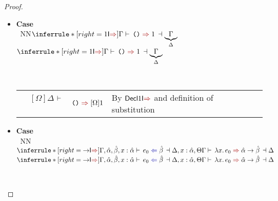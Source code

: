 \documentclass[a4paper]{article}
\makeatletter
\newcommand{\mathcolor}[2]{\text{\textcolor{#1}{\ensuremath{#2}}}}
\newcommand{\arr}{\rightarrow}
\def\CompactJudgments{0}
\newcommand{\entails}{\mathrel{\ifnum\CompactJudgments=1\vdash \else \vdash\,\fi}}
\newcommand{\ctxoutsym}{\ifnum\CompactJudgments=1\dashv \else \,\dashv \fi}
\newcommand{\ctxout}[1]{\mathrel{\ctxoutsym}{#1}}
\newcommand{\tyname}[1]{\textsf{\normalfont #1}}
\newcommand{\unitexp}{\text{\normalfont \tt()}}
\newcommand{\unitty}{\tyname{1}}
\newcommand{\Lemmaref}[1]{Lemma \ref{#1} (\nameref{#1})}   \newcommand{\Lemref}[1]{\Lemma \ref{#1}}   \newcommand{\Conjectureref}[1]{Conjecture \ref{#1}}
\gdef\xxDerivationProofCaseColor{N}
\newcommand{\DerivationProofCase}[3]{\smallskip
     \item \parbox[t]{100ex}{\textbf{Case } \\[-0.5em]
       $~$\hspace{5ex}
       \if\xxDerivationProofCaseColor N\ensuremath{\Infer{#1}{#2}{#3}}
       \else \colorbox{\xxDerivationProofCaseColor}{\ensuremath{\Infer{#1}{#2}{#3}}}\fi }\nopagebreak \\[-0.8ex]
  }
\newcommand{\BeginProof}{\renewcommand{\arraystretch}{1.1} \begin{tabular}[b]{r@{}r @{} l  l}}
\newcommand{\EndProof}{\end{tabular} \renewcommand{\arraystretch}{\mydefaultarraystretch}}
\newcommand{\Hand}{\text{\Pointinghand~~~~}}
\newcommand{\Pf}[4] {&$#1$ $#2$\, & $#3$ & #4 \\}
\newcommand{\Pfmrg}[3] {&$#1$\, & $#2$ & #3 \\}
\newcommand{\mkpf}[4] {\Pf{#2}{#1\,}{#3}{#4}}
\newcommand{\eqPf}[3] {\mkpf{=}{#1}{#2}{#3}}
\newcommand{\proofsep}{\,\\[-0.5em]}
\newenvironment{llproof}{\BeginProof}{\EndProof}
\newcommand{\decolumnizePf}{\end{llproof} ~\\ \begin{llproof}}
\newcommand{\Infer}[3]{\inferrule*[right={\text{\strut#1}}]{{}#2\mathstrut}{{}#3\mathstrut}}
\newcommand{\lam}[1]{\lambda #1.\,}
\newcommand{\substextendPf}[3] {\Pfmrg{{#1} \extendssym\,}{#2}{#3}}
\newcommand{\chkcolor}{dBlue}
\newcommand{\syncolor}{dRed}
\newcommand{\appcolor}{dDkGreen}
\newcommand{\chk}{\mathrel{\mathcolor{\chkcolor}{\Leftarrow}}}
\newcommand{\uncoloredsyn}{{\Rightarrow}}
\newcommand{\syn}{\mathrel{\mathcolor{\syncolor}{\uncoloredsyn}}}
\newcommand{\appsep}{\;{\mathcolor{\appcolor}{\bullet}}\;}
\newcommand{\app}{\mathrel{\mathcolor{\appcolor}{{\uncoloredsyn}\hspace{-1.2ex}{\uncoloredsyn}}}}
\newcommand{\chkjudg}[4]{\ensuremath{{#1} \entails {#2} \chk {#3} \ctxout{#4}}}
\newcommand{\synjudg}[4]{\ensuremath{{#1} \entails {#2} \syn {#3} \ctxout{#4}}}
\newcommand{\chkjudgPf}[5]{\Pf{#1}{\entails}{{#2} \chk {#3} \ctxout{#4}}{#5}}
\newcommand{\declchkjudgPf}[4]{\Pf{#1}{\entails}{{#2} \chk {#3}}{#4}}
\newcommand{\declappjudgPf}[5]{\Pf{#1}{\entails}{{#3} \appsep {#2} \app {#4}}{#5}}
\newcommand{\declsynjudgPf}[4]{\Pf{#1}{\entails}{{#2} \syn {#3}}{#4}}
\newcommand{\hypeq}[2]{{#1} = {#2}}
\newcommand{\extendssym}{\longrightarrow}
\newcommand{\ahat}{\hat{\alpha}}
\newcommand{\bhat}{\hat{\beta}}
\newcommand{\rulename}[1]{\text{\normalfont\textsf{#1}}}
\newcommand{\Decltyrulename}[1]{\ensuremath{\rulename{Decl#1}}\xspace}
\newcommand{\DeclIntroSynrulename}[1]{\Decltyrulename{\ensuremath{#1}I$\syn$}}
\newcommand{\DeclApprulename}[1]{\Decltyrulename{\ensuremath{#1}App}}
\newcommand{\DeclUnitIntroSyn}{\DeclIntroSynrulename{\unitty}}
\newcommand{\DeclArrApp}{\DeclApprulename{\arr}}
\newcommand{\Tyrulename}[1]{\ensuremath{\rulename{#1}}\xspace}
\newcommand{\IntroSynrulename}[1]{\Tyrulename{\ensuremath{#1}I$\syn$}}
\newcommand{\UnitIntroSyn}{\IntroSynrulename{\unitty}}
\newcommand{\ArrIntroSyn}{\IntroSynrulename{\arr}}
\makeatother
\begin{document}
\begin{proof}
\begin{itemize}
            \begin{llproof}
                \chkjudgPf{\overbrace{\Gamma_0[\ahat_2, \ahat_1, \hypeq{\ahat}{\ahat_1 \arr \ahat_2}]}^{\Gamma'}}{e}{\ahat_1}{\Delta}   {Subderivation}
                \substextendPf{\Delta}{\Omega}   {Given}
                \declchkjudgPf{[\Omega]\Delta}{e}{[\Omega]\ahat_1}   {By i.h.}
                \declappjudgPf{[\Omega]\Delta}{e}{([\Omega]\ahat_1) \arr ([\Omega]\ahat_2)}{[\Omega]\ahat_2}    {By \DeclArrApp}
                \decolumnizePf
                \substextendPf{\Gamma'}{\Delta}   {By \Lemmaref{lem:typing-extension}}
                \substextendPf{\Delta}{\Omega}   {Given}
                \substextendPf{\Gamma'}{\Omega}   {By \Lemmaref{lem:substextend-transitivity}}
                \eqPf{[\Gamma']\ahat}  {[\Gamma'](\ahat_1 \arr \ahat_2)}   {By definition of $[\Gamma'](-)$}
                \eqPf{[\Omega][\Gamma']\ahat}  {[\Omega][\Gamma'](\ahat_1 \arr \ahat_2)}   {Applying $\Omega$ to both sides}
                \eqPf{[\Omega]\ahat}  {[\Omega](\ahat_1 \arr \ahat_2)}   {By \Lemmaref{lem:subst-extension-invariance}, twice}
                \eqPf{~}  {([\Omega]\ahat_1) \arr ([\Omega]\ahat_2)}   {By definition of substitution}
                \proofsep
\Hand     \declappjudgPf{[\Omega]\Delta}{e}{[\Omega]\ahat}{[\Omega]\ahat_2}    {By above equality}
            \end{llproof}

\DerivationProofCase{\UnitIntroSyn}
                    { }
                    {{\synjudg{\Gamma}{\unitexp}{\unitty}{\underbrace{\Gamma}_{\Delta}}}}

                    \begin{llproof}
                      \Hand \declsynjudgPf{[\Omega]\Delta} {\unitexp} {[\Omega]\unitty}  {By \DeclUnitIntroSyn and definition of substitution}
                    \end{llproof}


               \DerivationProofCase{\ArrIntroSyn}
                    { \chkjudg{\Gamma, \ahat, \bhat, x : \ahat}{e_0}{\bhat}{\Delta, x : \ahat, \Theta}
                }
                    {{\synjudg{\Gamma}{\lam{x} e_0}{\ahat \arr \bhat}{\Delta}}}


\end{itemize}
\end{proof}
\end{document}

